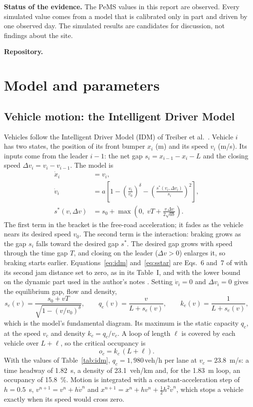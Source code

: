 \documentclass[11pt,letterpaper]{article}
\newcommand{\vehh}{\,veh/h}
\begin{document}
\textbf{Status of the evidence.} The PeMS values in this report are observed. Every
simulated value comes from a model that is calibrated only in part and driven by one
observed day. The simulated results are candidates for discussion, not findings about
the site.

\textbf{Repository.} \repourl

\section{Model and parameters}

\subsection{Vehicle motion: the Intelligent Driver Model}\label{sec:idm}

Vehicles follow the Intelligent Driver Model (IDM) of Treiber et al.\ \cite{treiber2000}.
Vehicle $i$ has two states, the position of its front bumper $x_i$ (m) and its speed
$v_i$ (m/s). Its inputs come from the leader $i-1$: the net gap $s_i=x_{i-1}-x_i-L$ and
the closing speed $\Delta v_i=v_i-v_{i-1}$. The model is
\begin{align}
\dot x_i &= v_i, \label{eq:state}\\
\dot v_i &= a\left[1-\left(\frac{v_i}{v_0}\right)^{\delta}
  -\left(\frac{s^*(v_i,\Delta v_i)}{s_i}\right)^{2}\right], \label{eq:idm}\\
s^*(v,\Delta v) &= s_0+\max\!\left(0,\;vT+\frac{v\,\Delta v}{2\sqrt{ab}}\right).
  \label{eq:sstar}
\end{align}
The first term in the bracket is the free-road acceleration; it fades as the vehicle
nears its desired speed $v_0$. The second term is the interaction: braking grows as the
gap $s_i$ falls toward the desired gap $s^*$. The desired gap grows with speed through
the time gap $T$, and closing on the leader ($\Delta v>0$) enlarges it, so braking
starts earlier. Equations~\eqref{eq:idm} and~\eqref{eq:sstar} are Eqs.~6 and~7 of
\cite{treiber2000} with its second jam distance set to zero, as in its Table~I, and with
the lower bound on the dynamic part used in the author's notes \cite{treiberIDM}.
Setting $\dot v_i=0$ and $\Delta v_i=0$ gives the equilibrium gap, flow and density,
\begin{equation}
s_e(v)=\frac{s_0+vT}{\sqrt{1-(v/v_0)^{\delta}}},\qquad
q_e(v)=\frac{v}{L+s_e(v)},\qquad k_e(v)=\frac{1}{L+s_e(v)},
\label{eq:eq}
\end{equation}
which is the model's fundamental diagram. Its maximum is the static capacity $q_c$, at
the speed $v_c$ and density $k_c=q_c/v_c$. A loop of length $\ell$ is covered by each
vehicle over $L+\ell$, so the critical occupancy is
\begin{equation}
o_c=k_c\,(L+\ell).
\label{eq:occ}
\end{equation}
With the values of Table~\ref{tab:idm}, $q_c=1{,}980$\vehh{} per lane at
$v_c=23.8$~m/s: a time headway of 1.82~s, a density of 23.1~veh/km and, for the 1.83~m
loop, an occupancy of 15.8~\%. Motion is integrated with a constant-acceleration step of
$h=0.5$~s, $v^{n+1}=v^n+h\dot v^n$ and $x^{n+1}=x^n+hv^n+\tfrac12h^2\dot v^n$, which
stops a vehicle exactly when its speed would cross zero.
\end{document}
